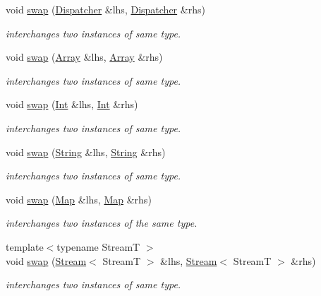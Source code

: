 \begin{DoxyCompactItemize}
void \hyperlink{namespacehryky_1_1reduction_ab53d31894f2c1fd91f612f0eebc4b4d1}{swap} (\hyperlink{classhryky_1_1reduction_1_1_dispatcher}{Dispatcher} \&lhs, \hyperlink{classhryky_1_1reduction_1_1_dispatcher}{Dispatcher} \&rhs)
\begin{DoxyCompactList}\small\item\em interchanges two instances of same type. \end{DoxyCompactList}\item 
void \hyperlink{namespacehryky_1_1reduction_a1aeea5acfa09944421be095ddab91c93}{swap} (\hyperlink{classhryky_1_1reduction_1_1_array}{Array} \&lhs, \hyperlink{classhryky_1_1reduction_1_1_array}{Array} \&rhs)
\begin{DoxyCompactList}\small\item\em interchanges two instances of same type. \end{DoxyCompactList}\item 
void \hyperlink{namespacehryky_1_1reduction_a34db6ba565346f5ff803a3eeef4a72b3}{swap} (\hyperlink{classhryky_1_1reduction_1_1_int}{Int} \&lhs, \hyperlink{classhryky_1_1reduction_1_1_int}{Int} \&rhs)
\begin{DoxyCompactList}\small\item\em interchanges two instances of same type. \end{DoxyCompactList}\item 
void \hyperlink{namespacehryky_1_1reduction_a91bca66b3ea92ee57eaa7def5e747618}{swap} (\hyperlink{classhryky_1_1reduction_1_1_string}{String} \&lhs, \hyperlink{classhryky_1_1reduction_1_1_string}{String} \&rhs)
\begin{DoxyCompactList}\small\item\em interchanges two instances of same type. \end{DoxyCompactList}\item 
\hypertarget{namespacehryky_1_1reduction_ada6472f3ff0179f0dbb0a4e64caa4450}{void \hyperlink{namespacehryky_1_1reduction_ada6472f3ff0179f0dbb0a4e64caa4450}{swap} (\hyperlink{classhryky_1_1reduction_1_1_map}{Map} \&lhs, \hyperlink{classhryky_1_1reduction_1_1_map}{Map} \&rhs)}\label{namespacehryky_1_1reduction_ada6472f3ff0179f0dbb0a4e64caa4450}

\begin{DoxyCompactList}\small\item\em interchanges two instances of the same type. \end{DoxyCompactList}\item 
{\footnotesize template$<$typename Stream\-T $>$ }\\void \hyperlink{namespacehryky_1_1reduction_a5c6f7d8075bd118cb0ae0b595748f8a1}{swap} (\hyperlink{classhryky_1_1reduction_1_1_stream}{Stream}$<$ Stream\-T $>$ \&lhs, \hyperlink{classhryky_1_1reduction_1_1_stream}{Stream}$<$ Stream\-T $>$ \&rhs)
\begin{DoxyCompactList}\small\item\em interchanges two instances of same type. \end{DoxyCompactList}\end{DoxyCompactItemize}



